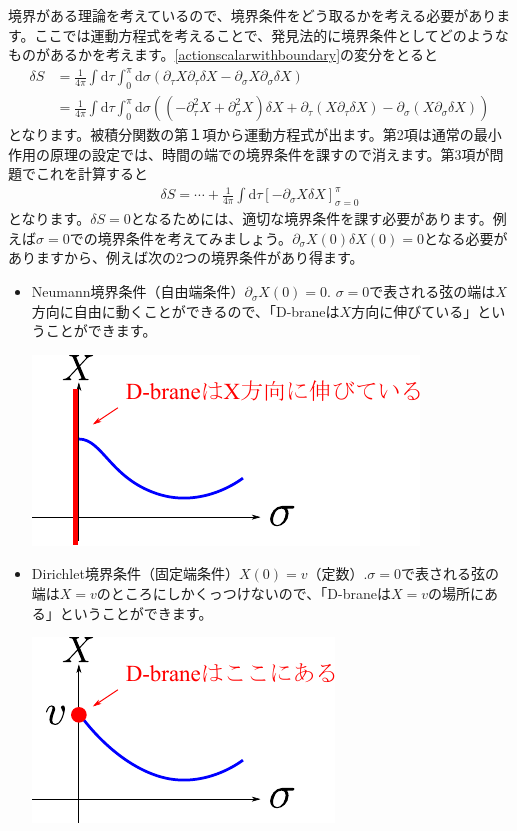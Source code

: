 \documentclass[report,paper=a4, fontsize=12pt, line_length=16cm, number_of_lines=33,dvipdfmx]{jlreq}
\numberwithin{equation}{chapter}
\numberwithin{equation}{section}
\newcommand{\del}{\partial}
\newcommand{\di}{\mathrm{d}}
\begin{document}
境界がある理論を考えているので、境界条件をどう取るかを考える必要があります。ここでは運動方程式を考えることで、発見法的に境界条件としてどのようなものがあるかを考えます。\eqref{actionscalarwithboundary}の変分をとると
\begin{align}
  \delta S&
  =\frac{1}{4\pi}\int \di \tau \int_{0}^{\pi}\di \sigma \left( \del_{\tau}X\del_{\tau}\delta X - \del_{\sigma}X\del_{\sigma}\delta X \right)\nonumber\\
  &=\frac{1}{4\pi}\int \di \tau \int_{0}^{\pi}\di \sigma \left( (-\del_{\tau}^2X+\del_{\sigma}^2X)\delta X+\del_{\tau}(X\del_{\tau}\delta X) - \del_{\sigma}(X\del_{\sigma}\delta X) \right)
\end{align}
となります。被積分関数の第１項から運動方程式が出ます。第2項は通常の最小作用の原理の設定では、時間の端での境界条件を課すので消えます。第3項が問題でこれを計算すると
\begin{align}
  \delta S = \cdots +\frac{1}{4\pi}\int \di \tau [-\del_{\sigma}X \delta X]_{\sigma=0}^{\pi}
\end{align}
となります。$\delta S=0$となるためには、適切な境界条件を課す必要があります。例えば$\sigma=0$での境界条件を考えてみましょう。$\del_{\sigma}X(0)\delta X(0)=0$となる必要がありますから、例えば次の2つの境界条件があり得ます。
\begin{itemize}
  \item Neumann境界条件（自由端条件）$\del_{\sigma} X(0)=0$. $\sigma=0$で表される弦の端は$X$方向に自由に動くことができるので、「D-braneは$X$方向に伸びている」ということができます。\\
  \begin{center}
    \includegraphics{NBC.pdf}    
  \end{center}
  \item Dirichlet境界条件（固定端条件）$X(0)=v$（定数）.$\sigma=0$で表される弦の端は$X=v$のところにしかくっつけないので、「D-braneは$X=v$の場所にある」ということができます。\\
  \begin{center}
    \includegraphics{DBC.pdf}    
  \end{center}
\end{itemize}
\end{document}
